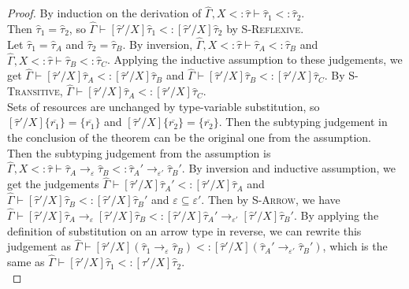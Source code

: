 \documentclass{llncs}
\begin{document}
\begin{proof} By induction on the derivation of $\hat \Gamma, X <: \hat \tau \vdash \hat \tau_1 <: \hat \tau_2$.\\

 Then $\hat \tau_1 = \hat \tau_2$, so $\hat \Gamma \vdash [\hat \tau'/X]\hat \tau_1 <: [\hat \tau'/X]\hat \tau_2$ by \textsc{S-Reflexive}. \\

 Let $\hat \tau_1 = \hat \tau_A$ and $\hat \tau_2 = \hat \tau_B$. By inversion, $\hat \Gamma, X <: \hat \tau \vdash \hat \tau_A <: \hat \tau_B$ and $\hat \Gamma, X <: \hat \tau \vdash \hat \tau_B <: \hat \tau_C$. Applying the inductive assumption to these judgements, we get $\hat \Gamma \vdash [\hat \tau'/X]\hat \tau_A <: [\hat \tau'/X]\hat \tau_B$ and $\hat \Gamma \vdash [\hat \tau'/X]\hat \tau_B <: [\hat \tau'/X]\hat \tau_C$. By \textsc{S-Transitive}, $\hat \Gamma \vdash [\hat \tau'/X]\hat \tau_A <: [\hat \tau'/X]\hat \tau_C$.\\

 Sets of resources are unchanged by type-variable substitution, so $[\hat \tau'/X]\{ \overline{r_1} \} = \{ \overline{r_1} \}$ and $[\hat \tau'/X]\{ \overline{r_2} \} = \{ \overline{r_2} \}$. Then the subtyping judgement in the conclusion of the theorem can be the original one from the assumption. \\

 Then the subtyping judgement from the assumption is $\hat \Gamma, X <: \hat \tau \vdash \hat \tau_A \rightarrow_{\varepsilon} \hat \tau_B <: \hat \tau_A' \rightarrow_{\varepsilon'} \hat \tau_B'$. By inversion and inductive assumption, we get the judgements $\hat \Gamma \vdash [\hat \tau'/X]\hat \tau_A' <: [\hat \tau'/X]\hat \tau_A$ and $\hat \Gamma \vdash [\hat \tau'/X]\hat \tau_B <: [\hat \tau'/X]\hat \tau_B'$ and $\varepsilon \subseteq \varepsilon'$. Then by \textsc{S-Arrow}, we have $\hat \Gamma \vdash [\hat \tau'/X]\hat \tau_A \rightarrow_{\varepsilon} [\hat \tau'/X]\hat \tau_B <: [\hat \tau'/X]\hat \tau_A' \rightarrow_{\varepsilon'} [\hat \tau'/X]\hat \tau_B'$. By applying the definition of substitution on an arrow type in reverse, we can rewrite this judgement as $\hat \Gamma \vdash [\hat \tau'/X](\hat \tau_1 \rightarrow_{\varepsilon} \hat \tau_B) <: [\hat \tau'/X](\hat \tau_A' \rightarrow_{\varepsilon'} \hat \tau_B')$, which is the same as $\hat \Gamma \vdash [\hat \tau'/X]\hat \tau_1 <: [\hat \tau'/X]\hat \tau_2$. \\


\end{proof}
\end{document}
